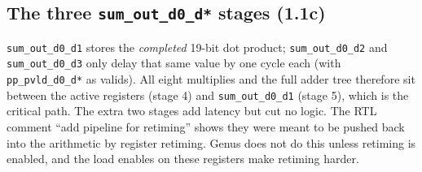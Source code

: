 \subsection{The three \texttt{sum\_out\_d0\_d*} stages (1.1c)}

\texttt{sum\_out\_d0\_d1} stores the \emph{completed} 19-bit dot product;
\texttt{sum\_out\_d0\_d2} and \texttt{sum\_out\_d0\_d3} only delay that same value by one cycle each
(with \texttt{pp\_pvld\_d0\_d*} as valids). All eight multiplies and the full adder tree therefore
sit between the active registers (stage 4) and \texttt{sum\_out\_d0\_d1} (stage 5), which is the
critical path. The extra two stages add latency but cut no logic.
The RTL comment ``add pipeline for retiming'' shows they were meant to be pushed back into the
arithmetic by register retiming. Genus does not do this unless retiming is enabled, and the load
enables on these registers make retiming harder.
